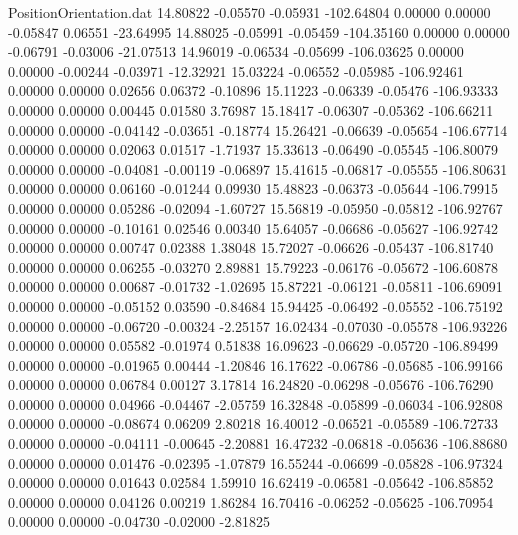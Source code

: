 \begin{filecontents}{PositionOrientation.dat}
  14.80822   -0.05570   -0.05931  -102.64804    0.00000    0.00000   -0.05847    0.06551  -23.64995
  14.88025   -0.05991   -0.05459  -104.35160    0.00000    0.00000   -0.06791   -0.03006  -21.07513
  14.96019   -0.06534   -0.05699  -106.03625    0.00000    0.00000   -0.00244   -0.03971  -12.32921
  15.03224   -0.06552   -0.05985  -106.92461    0.00000    0.00000    0.02656    0.06372   -0.10896
  15.11223   -0.06339   -0.05476  -106.93333    0.00000    0.00000    0.00445    0.01580    3.76987
  15.18417   -0.06307   -0.05362  -106.66211    0.00000    0.00000   -0.04142   -0.03651   -0.18774
  15.26421   -0.06639   -0.05654  -106.67714    0.00000    0.00000    0.02063    0.01517   -1.71937
  15.33613   -0.06490   -0.05545  -106.80079    0.00000    0.00000   -0.04081   -0.00119   -0.06897
  15.41615   -0.06817   -0.05555  -106.80631    0.00000    0.00000    0.06160   -0.01244    0.09930
  15.48823   -0.06373   -0.05644  -106.79915    0.00000    0.00000    0.05286   -0.02094   -1.60727
  15.56819   -0.05950   -0.05812  -106.92767    0.00000    0.00000   -0.10161    0.02546    0.00340
  15.64057   -0.06686   -0.05627  -106.92742    0.00000    0.00000    0.00747    0.02388    1.38048
  15.72027   -0.06626   -0.05437  -106.81740    0.00000    0.00000    0.06255   -0.03270    2.89881
  15.79223   -0.06176   -0.05672  -106.60878    0.00000    0.00000    0.00687   -0.01732   -1.02695
  15.87221   -0.06121   -0.05811  -106.69091    0.00000    0.00000   -0.05152    0.03590   -0.84684
  15.94425   -0.06492   -0.05552  -106.75192    0.00000    0.00000   -0.06720   -0.00324   -2.25157
  16.02434   -0.07030   -0.05578  -106.93226    0.00000    0.00000    0.05582   -0.01974    0.51838
  16.09623   -0.06629   -0.05720  -106.89499    0.00000    0.00000   -0.01965    0.00444   -1.20846
  16.17622   -0.06786   -0.05685  -106.99166    0.00000    0.00000    0.06784    0.00127    3.17814
  16.24820   -0.06298   -0.05676  -106.76290    0.00000    0.00000    0.04966   -0.04467   -2.05759
  16.32848   -0.05899   -0.06034  -106.92808    0.00000    0.00000   -0.08674    0.06209    2.80218
  16.40012   -0.06521   -0.05589  -106.72733    0.00000    0.00000   -0.04111   -0.00645   -2.20881
  16.47232   -0.06818   -0.05636  -106.88680    0.00000    0.00000    0.01476   -0.02395   -1.07879
  16.55244   -0.06699   -0.05828  -106.97324    0.00000    0.00000    0.01643    0.02584    1.59910
  16.62419   -0.06581   -0.05642  -106.85852    0.00000    0.00000    0.04126    0.00219    1.86284
  16.70416   -0.06252   -0.05625  -106.70954    0.00000    0.00000   -0.04730   -0.02000   -2.81825

\end{filecontents}
